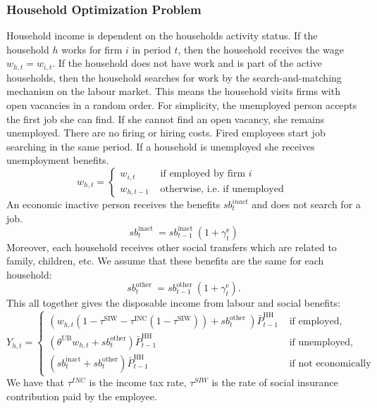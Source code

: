 \subsubsection{Household Optimization Problem}
Household income is dependent on the households activity status. If the household $h$ works for firm $i$ in period $t$, then the household receives the wage $w_{h,t}=w_{i,t}$. If the household does not have work and is part of the active households, then the household searches for work by the search-and-matching mechanism on the labour market. This means the household visits firms with open vacancies in a random order. For simplicity, the unemployed person accepts the first job she can find. If she cannot find an open vacancy, she remains unemployed. There are no firing or hiring costs. Fired employees start job searching in the same period. If a household is unemployed she receives unemployment benefits. 
\begin{equation}
    w_{h,t}= \begin{cases}w_{i,t} & \text { if employed by firm } i \\ w_{h,t-1} & \text { otherwise, i.e. if unemployed }\end{cases}\end{equation}
An economic inactive person receives the benefits $sb^{inact}_t$ and does not search for a job.
\begin{equation}
    s b^{\text {inact }}_t=s b^{\text {inact }}_{t-1}\left(1+\gamma^{\mathrm{e}}_t\right)
\end{equation}
Moreover, each household receives other social transfers which are related to family, children, etc. We assume that these benefits are the same for each household:
\begin{equation}
    s b^{\text {other }}_t=s b^{\text {other }}_{t-1}\left(1+\gamma^{\mathrm{e}}_t\right).
\end{equation}
This all together gives the disposable income from labour and social benefits:
\begin{equation}
{\displaystyle 
    Y_{h,t} = \begin{cases}\left(w_{h,t}\left(1-\tau^{\mathrm{SIW}}-\tau^{\mathrm{INC}}\left(1-\tau^{\mathrm{SIW}}\right)\right)+s b^{\text {other }}_t\right) \bar{P}^{\mathrm{HH}}_{t-1} & \text { if employed, } \\ \left(\theta^{\mathrm{UB}} w_{h,t}+s b^{\mathrm{other}}_t\right) \bar{P}^{\mathrm{HH}}_{t-1} & \text { if unemployed, } \\ \left(s b^{\mathrm{inact}}_t+s b^{\mathrm{other}}_t\right) \bar{P}^{\mathrm{HH}}_{t-1} & \text { if not economically active. } \end{cases}}
    \label{eq:income_households}
\end{equation}
We have that $\tau^{INC}$ is the income tax rate, $\tau^{SIW}$ is the rate of social insurance contribution paid by the employee. \\

